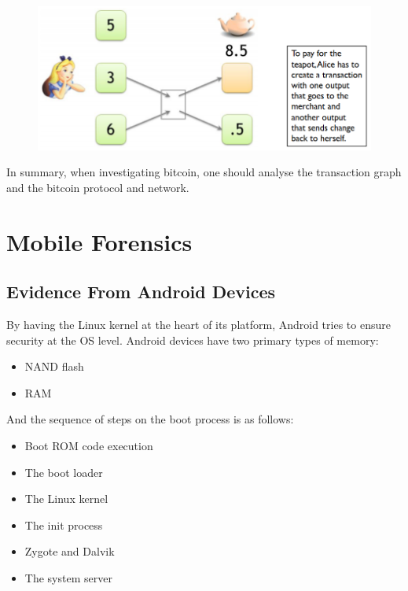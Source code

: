 \documentclass[10pt,a4paper]{report}
\begin{document}
\begin{figure}[H]
\centering
\includegraphics[scale=0.4]{33.png}
\end{figure}
In summary, when investigating bitcoin, one should analyse the transaction graph and the bitcoin protocol and network.
\section{Mobile Forensics}
\subsection{Evidence From Android Devices}
By having the Linux kernel at the heart of its platform, Android tries to ensure security at the OS level. Android devices have two primary types of memory:
\begin{itemize}
\item NAND flash
\item RAM
\end{itemize}
And the sequence of steps on the boot process is as follows:
\begin{itemize}
\item Boot ROM code execution
\item The boot loader
\item The Linux kernel
\item The init process
\item Zygote and Dalvik
\item The system server
\end{itemize}
\end{document}
